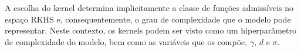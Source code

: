 










A escolha do kernel determina implicitamente a classe de funções admissíveis no espaço RKHS e,
consequentemente, o grau de complexidade que o modelo pode representar. Neste contexto, os kernels podem ser
visto como um hiperparâmetro de complexidade do modelo, bem como as variáveis que os compõe, $\gamma\text{, } d\text{ e } \sigma$.

